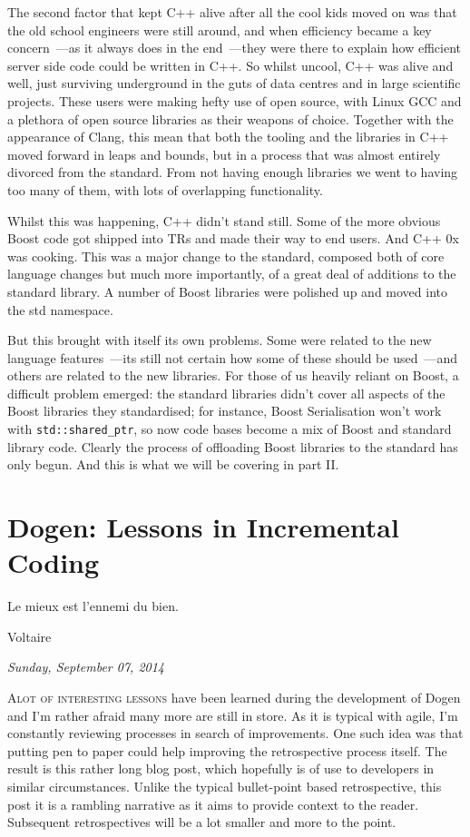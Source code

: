 \documentclass{book}
\begin{document}
The second factor that kept C++ alive after all the cool kids moved on
was that the old school engineers were still around, and when
efficiency became a key concern~---as it always does in the end~---they
were there to explain how efficient server side code could be written
in C++. So whilst uncool, C++ was alive and well, just surviving
underground in the guts of data centres and in large scientific
projects. These users were making hefty use of open source, with Linux
GCC and a plethora of open source libraries as their weapons of
choice. Together with the appearance of Clang, this mean that both the
tooling and the libraries in C++ moved forward in leaps and bounds,
but in a process that was almost entirely divorced from the
standard. From not having enough libraries we went to having too many
of them, with lots of overlapping functionality.

Whilst this was happening, C++ didn't stand still. Some of the more
obvious Boost code got shipped into TRs and made their way to end
users. And C++ 0x was cooking. This was a major change to the
standard, composed both of core language changes but much more
importantly, of a great deal of additions to the standard library. A
number of Boost libraries were polished up and moved into the std
namespace.

But this brought with itself its own problems. Some were related to
the new language features~---its still not certain how some of these
should be used~---and others are related to the new libraries. For
those of us heavily reliant on Boost, a difficult problem emerged: the
standard libraries didn't cover all aspects of the Boost libraries
they standardised; for instance, Boost Serialisation won't work with
\texttt{std::shared\_ptr}, so now code bases become a mix of Boost and
standard library code. Clearly the process of offloading Boost
libraries to the standard has only begun. And this is what we will be
covering in part II.

\chapter{Dogen: Lessons in Incremental Coding}

\epigraph{Le mieux est l'ennemi du bien.}{Voltaire}

\begin{flushright}
  \emph{Sunday, September 07, 2014}
\end{flushright}

\lettrine{A} {lot of interesting lessons} have been learned during the
development of Dogen and I'm rather afraid many more are still in
store. As it is typical with agile, I'm constantly reviewing processes
in search of improvements. One such idea was that putting pen to paper
could help improving the retrospective process itself. The result is
this rather long blog post, which hopefully is of use to developers in
similar circumstances. Unlike the typical bullet-point based
retrospective, this post it is a rambling narrative as it aims to
provide context to the reader. Subsequent retrospectives will be a lot
smaller and more to the point.
\end{document}
